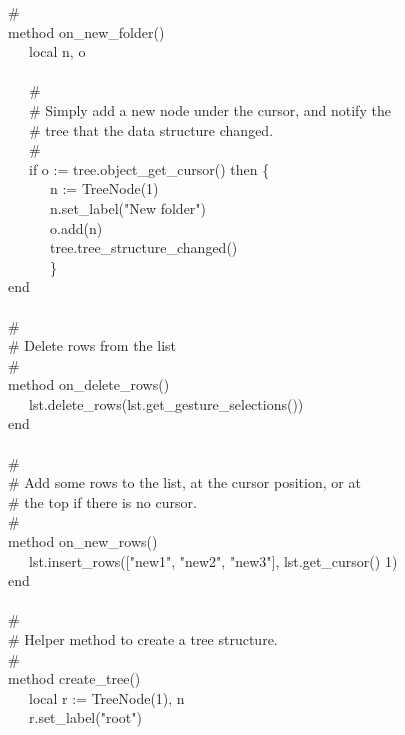 {\>   \# \\
\>   method on\_new\_folder() \\
\>   \ \ \ local n, o \\
\ \\
\>   \ \ \ \# \\
\>   \ \ \ \# Simply add a new node under the cursor, and notify the \\
\>   \ \ \ \# tree that the data structure changed. \\
\>   \ \ \ \# \\
\>   \ \ \ if o := tree.object\_get\_cursor() then \{ \\
\>   \ \ \ \ \ \ n := TreeNode(1) \\
\>   \ \ \ \ \ \ n.set\_label("New
folder") \\
\>   \ \ \ \ \ \ o.add(n) \\
\>   \ \ \ \ \ \ tree.tree\_structure\_changed() \\
\>   \ \ \ \ \ \ \} \\
\>   end \\
\ \\
\>   \# \\
\>   \# Delete rows from the list \\
\>   \# \\
\>   method on\_delete\_rows() \\
\>   \ \ \ lst.delete\_rows(lst.get\_gesture\_selections()) \\
\>   end \\
\ \\
\>   \# \\
\>   \# Add some rows to the list, at the cursor position, or at \\
\>   \# the top if there is no cursor. \\
\>   \# \\
\>   method on\_new\_rows() \\
\>   \ \ \ lst.insert\_rows(["new1",
"new2",
"new3"], lst.get\_cursor() {\textbar} 1) \\
\>   end \\
\ \\
\>   \# \\
\>   \# Helper method to create a tree structure. \\
\>   \# \\
\>   method create\_tree() \\
\>   \ \ \ local r := TreeNode(1), n \\
\>   \ \ \ r.set\_label("root") \\
\ \\
}
